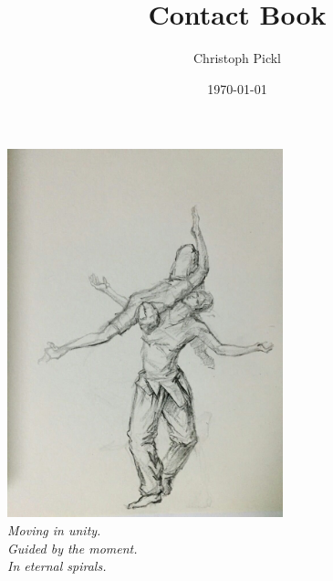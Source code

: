 \documentclass[a4paper]{article}
\title{Contact Book}
\date{\today}
\author{Christoph Pickl}
\begin{document}
\maketitle
\begin{center}
	\includegraphics[width=8cm]{images/cover.jpg}
	\vspace{0.5cm}
	\\
	\textit{Moving in unity.}\\
	\textit{Guided by the moment.}\\
	\textit{In eternal spirals.}
\end{center}
\newpage
\tableofcontents
\newpage
{}






\end{document}
